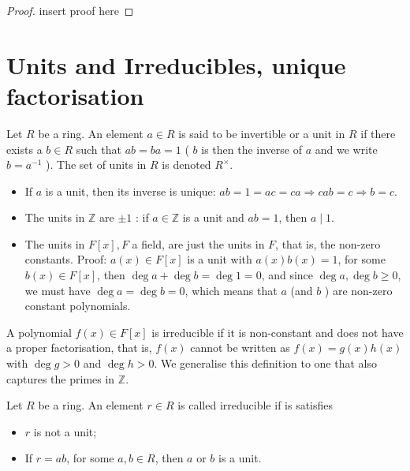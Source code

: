 \begin{proof}
  insert proof here
\end{proof} 

\section{Units and Irreducibles, unique factorisation}

\begin{definition}
  Let \(R\) be a ring. An element \(a \in R\) is said to be invertible or a unit in \(R\) if there exists a \(b \in R\) such that \(a b=b a=1\) ( \(b\) is then the inverse of \(a\) and we write \(b=a^{-1}\) ). The set of units in \(R\) is denoted \(R^{\times}\).
\end{definition}

\begin{example}
  
  \begin{itemize}\emph{}


  \item[-] If \(a\) is a unit, then its inverse is unique: \(a b=1=a c=c a \Rightarrow c a b=c \Rightarrow b=c\).
\item[-] The units in \(\mathbb{Z}\) are \(\pm 1\) : if \(a \in \mathbb{Z}\) is a unit and \(a b=1\), then \(a \mid 1\).
\item[-] The units in \(F[x], F\) a field, are just the units in \(F\), that is, the non-zero constants. Proof: \(a(x) \in F[x]\) is a unit with \(a(x) b(x)=1\), for some \(b(x) \in F[x]\), then \(\operatorname{deg} a+\operatorname{deg} b=\operatorname{deg} 1=0\), and since \(\operatorname{deg} a, \operatorname{deg} b \geq 0\), we must have \(\operatorname{deg} a=\operatorname{deg} b=0\), which means that \(a\) (and \(b\) ) are non-zero constant polynomials.
\end{itemize}
\end{example}

\begin{definition}
A polynomial \(f(x) \in F[x]\) is irreducible if it is non-constant and does not have a proper factorisation, that is, \(f(x)\) cannot be written as \(f(x)=g(x) h(x)\) with \(\operatorname{deg} g>0\) and \(\operatorname{deg} h>0\). We generalise this definition to one that also captures the primes in \(\mathbb{Z}\).
\end{definition}

\begin{definition}
  Let \(R\) be a ring. An element \(r \in R\) is called irreducible if is satisfies
\begin{itemize}
\item[-] \(r\) is not a unit;
\item[-] If \(r=a b\), for some \(a, b \in R\), then \(a\) or \(b\) is a unit.
\end{itemize}
\end{definition}

